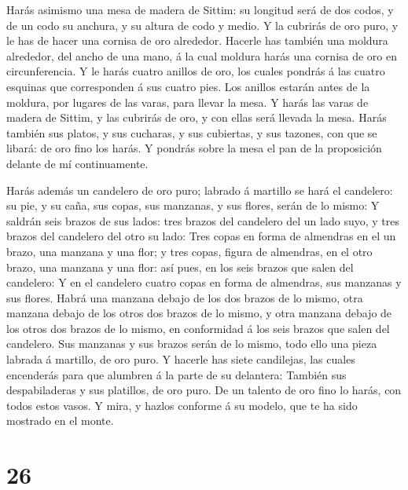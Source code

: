  Harás asimismo una mesa de madera de Sittim: su longitud
será de dos codos, y de un codo su anchura, y su altura de codo y medio.
 Y la cubrirás de oro puro, y le has de hacer una cornisa
de oro alrededor.  Hacerle has también una moldura
alrededor, del ancho de una mano, á la cual moldura harás una cornisa de
oro en circunferencia.  Y le harás cuatro anillos de oro,
los cuales pondrás á las cuatro esquinas que corresponden á sus cuatro
pies.  Los anillos estarán antes de la moldura, por lugares
de las varas, para llevar la mesa.  Y harás las varas de
madera de Sittim, y las cubrirás de oro, y con ellas será llevada la
mesa.  Harás también sus platos, y sus cucharas, y sus
cubiertas, y sus tazones, con que se libará: de oro fino los harás.
 Y pondrás sobre la mesa el pan de la proposición delante
de mí continuamente.

 Harás además un candelero de oro puro; labrado á martillo
se hará el candelero: su pie, y su caña, sus copas, sus manzanas, y sus
flores, serán de lo mismo:  Y saldrán seis brazos de sus
lados: tres brazos del candelero del un lado suyo, y tres brazos del
candelero del otro su lado:  Tres copas en forma de
almendras en el un brazo, una manzana y una flor; y tres copas, figura
de almendras, en el otro brazo, una manzana y una flor: así pues, en los
seis brazos que salen del candelero:  Y en el candelero
cuatro copas en forma de almendras, sus manzanas y sus flores.
 Habrá una manzana debajo de los dos brazos de lo mismo,
otra manzana debajo de los otros dos brazos de lo mismo, y otra manzana
debajo de los otros dos brazos de lo mismo, en conformidad á los seis
brazos que salen del candelero.  Sus manzanas y sus brazos
serán de lo mismo, todo ello una pieza labrada á martillo, de oro puro.
 Y hacerle has siete candilejas, las cuales encenderás para
que alumbren á la parte de su delantera:  También sus
despabiladeras y sus platillos, de oro puro.  De un talento
de oro fino lo harás, con todos estos vasos.  Y mira, y
hazlos conforme á su modelo, que te ha sido mostrado en el monte.

\hypertarget{section-25}{%
\section{26}\label{section-25}}

